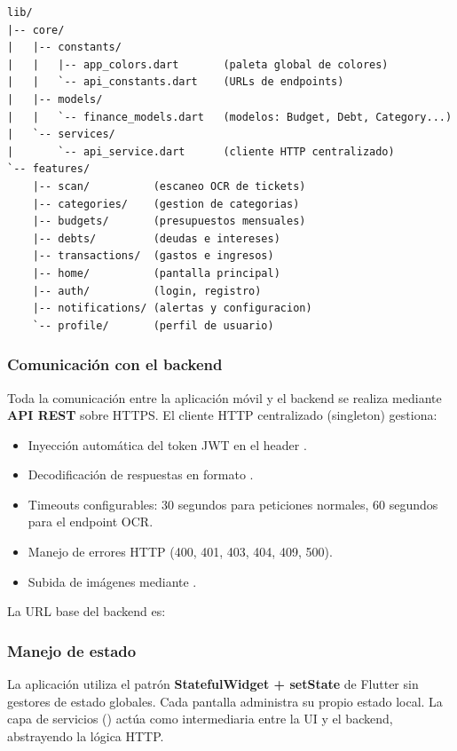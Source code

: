 \begin{lstlisting}[style=codigobase, language={},
    caption={Estructura de directorios del proyecto Flutter}]
lib/
|-- core/
|   |-- constants/
|   |   |-- app_colors.dart       (paleta global de colores)
|   |   `-- api_constants.dart    (URLs de endpoints)
|   |-- models/
|   |   `-- finance_models.dart   (modelos: Budget, Debt, Category...)
|   `-- services/
|       `-- api_service.dart      (cliente HTTP centralizado)
`-- features/
    |-- scan/          (escaneo OCR de tickets)
    |-- categories/    (gestion de categorias)
    |-- budgets/       (presupuestos mensuales)
    |-- debts/         (deudas e intereses)
    |-- transactions/  (gastos e ingresos)
    |-- home/          (pantalla principal)
    |-- auth/          (login, registro)
    |-- notifications/ (alertas y configuracion)
    `-- profile/       (perfil de usuario)
\end{lstlisting}

\subsubsection{Comunicación con el backend}

Toda la comunicación entre la aplicación móvil y el backend se realiza
mediante \textbf{API REST} sobre HTTPS. El cliente HTTP centralizado
 (singleton) gestiona:

\begin{itemize}
  \item Inyección automática del token JWT en el header
        .
  \item Decodificación de respuestas en formato .
  \item Timeouts configurables: 30 segundos para peticiones normales,
        60 segundos para el endpoint OCR.
  \item Manejo de errores HTTP (400, 401, 403, 404, 409, 500).
  \item Subida de imágenes mediante .
\end{itemize}

La URL base del backend es:

\subsubsection{Manejo de estado}

La aplicación utiliza el patrón \textbf{StatefulWidget + setState} de
Flutter sin gestores de estado globales. Cada pantalla administra su
propio estado local. La capa de servicios () actúa como
intermediaria entre la UI y el backend, abstrayendo la lógica HTTP.

